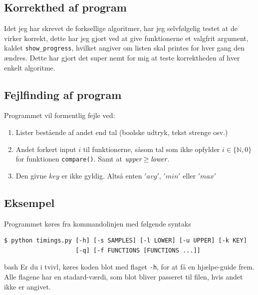 \documentclass[12pt]{article}
\begin{document}
        \subsection{Korrekthed af program}
        Idet jeg har skrevet de forksellige algoritmer, har jeg selvfølgelig testet at de virker korrekt, dette har jeg gjort ved at give funktionerne et valgfrit argument, kaldet \texttt{show\_progress}, hvilket angiver om listen skal printes for hver gang den ændres.
        Dette har gjort det super nemt for mig at teste korrektheden af hver enkelt algoritme.


        \subsection{Fejlfinding af program}
        Programmet vil formentlig fejle ved:
        \begin{enumerate}
            \item Lister bestående af andet end tal (boolske udtryk, tekst strenge osv.)
            \item Andet forkert input $i$ til funktionerne, såsom tal som ikke opfylder $i \in \{\mathbb{N}, 0\}$ for funktionen \texttt{compare()}. Samt at $\emph{upper} \geq \emph{lower}$.
            \item Den givne $key$ er ikke gyldig. Altså enten $'avg'$, $'min'$ eller $'max'$
        \end{enumerate}

        \subsection{Eksempel}
        Programmet køres fra kommandolinjen med følgende syntaks
        \begin{verbatim}
$ python timings.py [-h] [-s SAMPLES] [-l LOWER] [-u UPPER] [-k KEY]
                    [-q] [-f FUNCTIONS [FUNCTIONS ...]]
        \end{verbatim}{bash}
        Er du i tvivl, køres koden blot med flaget \texttt{-h}, for at få en hjælpe-guide frem.
        Alle flagene har en stadard-værdi, som blot bliver passeret til filen, hvis andet ikke er angivet.
\end{document}
